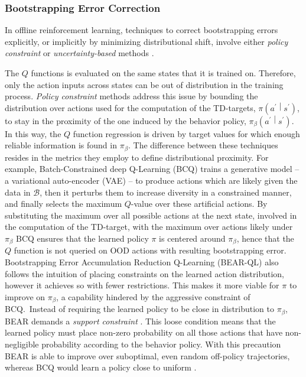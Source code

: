 \subsubsection{Bootstrapping Error
Correction}\label{sec:intro_related_work}
In offline reinforcement learning, techniques to correct bootstrapping
errors explicitly, or implicitly by minimizing distributional shift,
involve either \textit{policy constraint} or
\textit{uncertainty-based} methods \citep{levine2020offline}.

The $Q$ functions is evaluated on the same states that it is
trained on. Therefore, only the action inputs across states can be out
of distribution in the training process. \textit{Policy constraint}
methods address this issue by bounding the distribution over actions
used for the computation of the TD-targets,
$\pi\left(a^\prime\middle|s^\prime\right)$, to stay in the proximity
of the one induced by the behavior policy,
$\pi_\beta\left(a^\prime\middle|s^\prime\right)$. In this way, the $Q$
function regression is driven by target values for which enough
reliable information is found in $\pi_\beta$.
The difference
between these techniques resides in the metrics they employ to define
distributional proximity.
For example, Batch-Constrained deep Q-Learning (BCQ)
\citep{pmlr-v97-fujimoto19a} trains a generative model -- a variational
auto-encoder (VAE) \citep{kingma2013auto} -- to produce actions which
are likely given the data in $\mathcal{B}$, then it perturbs them to
increase diversity in a constrained manner, and finally selects the
maximum $Q$-value over these artificial actions. By substituting the
maximum over all possible actions at the next state, involved in the
computation of the TD-target, with the maximum over actions likely
under $\pi_\beta$ BCQ ensures that the learned policy $\pi$ is
centered around $\pi_\beta$, hence that the $Q$ function is not
queried on OOD actions with resulting bootstrapping
error. Bootstrapping Error Accumulation Reduction Q-Learning (BEAR-QL)
\citep{kumar2019stabilizing} also follows the intuition of placing
constraints on the learned action distribution, however it achieves so
with fewer restrictions. This makes it more viable for $\pi$ to
improve on $\pi_\beta$, a capability hindered by the aggressive
constraint of BCQ.\ Instead of requiring the learned policy to be
close in distribution to $\pi_\beta$, BEAR demands a \textit{support
constraint} \citep{kumar}. This loose condition means that the
learned policy must place non-zero probability on all those actions
that have non-negligible probability according to the behavior policy.
With this precaution BEAR is able to improve over suboptimal, even
random off-policy trajectories, whereas BCQ would learn a policy close
to uniform \citep{kumar2019stabilizing}.

